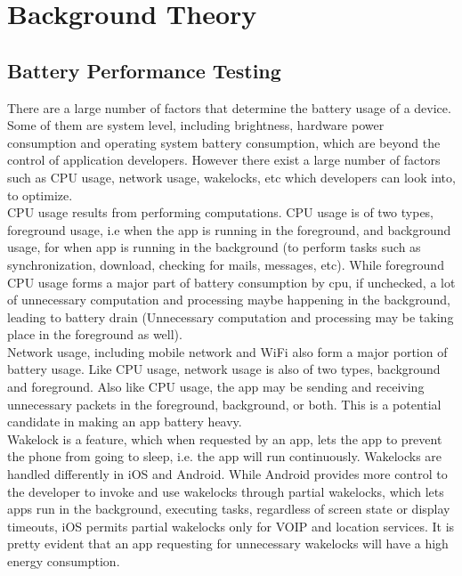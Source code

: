 \setlength\parindent{0pt}

\chapter{Background Theory}

\section{Battery Performance Testing}
There are a large number of factors that determine the battery usage of a device. Some of them are system level, including brightness, hardware power consumption and operating system battery consumption, which are beyond the control of application developers. However there exist a large number of factors such as CPU usage, network usage, wakelocks, etc which developers can look into, to optimize. \\

CPU usage results from performing computations. CPU usage is of two types, foreground usage, i.e when the app is running in the foreground, and background usage, for when app is running in the background (to perform tasks such as synchronization, download, checking for mails, messages, etc). While foreground CPU usage forms a major part of battery consumption by cpu, if unchecked, a lot of unnecessary computation and processing maybe happening in the background, leading to battery drain (Unnecessary computation and processing may be taking place in the foreground as well). \\

Network usage, including mobile network and WiFi also form a major portion of battery usage. Like CPU usage, network usage is also of two types, background and foreground. Also like CPU usage, the app may be sending and receiving unnecessary packets in the foreground, background, or both. This is a potential candidate in making an app battery heavy.\\

Wakelock is a feature, which when requested by an app, lets the app to prevent the phone from going to sleep, i.e. the app will run continuously.\cite{wakelock} Wakelocks are handled differently in iOS and Android. While Android provides more control to the developer to invoke and use wakelocks through partial wakelocks, which lets apps run in the background, executing tasks, regardless of screen state or display timeouts, iOS permits partial wakelocks only for VOIP and location services.\cite{stackoverflow} It is pretty evident that an app requesting for unnecessary wakelocks will have a high energy consumption.\\

